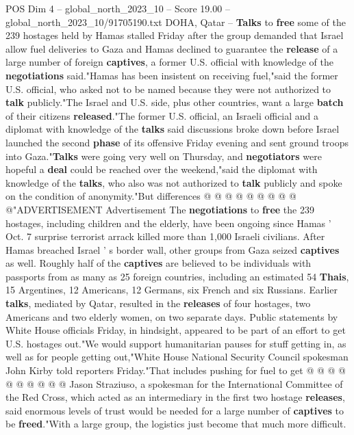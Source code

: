 \begin{textsample}{POS Dim 4 – global\_north\_2023\_10 – Score 19.00 – global\_north\_2023\_10/91705190.txt}  \label{ex:f4_pos_441}
DOHA, Qatar -- \textbf{Talks} to \textbf{free} some of the 239 hostages held by Hamas stalled Friday after the group demanded that Israel allow fuel deliveries to Gaza and Hamas declined to guarantee the \textbf{release} of a large number of foreign \textbf{captives}, a former U.S. official with knowledge of the \textbf{negotiations} said."Hamas has been insistent on receiving fuel,"said the former U.S. official, who asked not to be named because they were not authorized to \textbf{talk} publicly."The Israel and U.S. side, plus other countries, want a large \textbf{batch} of their citizens \textbf{released}."The former U.S. official, an Israeli official and a diplomat with knowledge of the \textbf{talks} said discussions broke down before Israel launched the second \textbf{phase} of its offensive Friday evening and sent ground troops into Gaza."\textbf{Talks} were going very well on Thursday, and \textbf{negotiators} were hopeful a \textbf{deal} could be reached over the weekend,"said the diplomat with knowledge of the \textbf{talks}, who also was not authorized to \textbf{talk} publicly and spoke on the condition of anonymity."But differences @ @ @ @ @ @ @ @ @ @"ADVERTISEMENT Advertisement The \textbf{negotiations} to \textbf{free} the 239 hostages, including children and the elderly, have been ongoing since Hamas ' Oct. 7 surprise terrorist arrack killed more than 1,000 Israeli civilians.
After Hamas breached Israel ' s border wall, other groups from Gaza seized \textbf{captives} as well.
Roughly half of the \textbf{captives} are believed to be individuals with passports from as many as 25 foreign countries, including an estimated 54 \textbf{Thais}, 15 Argentines, 12 Americans, 12 Germans, six French and six Russians.
Earlier \textbf{talks}, mediated by Qatar, resulted in the \textbf{releases} of four hostages, two Americans and two elderly women, on two separate days.
Public statements by White House officials Friday, in hindsight, appeared to be part of an effort to get U.S. hostages out."We would support humanitarian pauses for stuff getting in, as well as for people getting out,"White House National Security Council spokesman John Kirby told reporters Friday."That includes pushing for fuel to get @ @ @ @ @ @ @ @ @ @ Jason Straziuso, a spokesman for the International Committee of the Red Cross, which acted as an intermediary in the first two hostage \textbf{releases}, said enormous levels of trust would be needed for a large number of \textbf{captives} to be \textbf{freed}."With a large group, the logistics just become that much more difficult.

\end{textsample}
